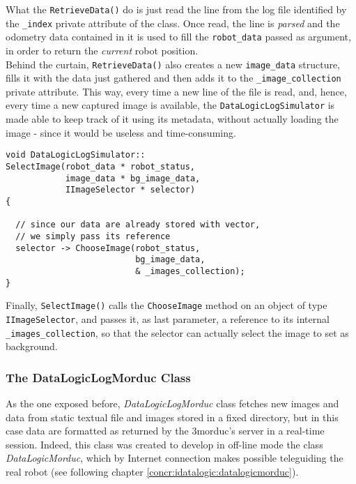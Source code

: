 What the \texttt{RetrieveData()} do is just read the line from the log 
file identified by the \texttt{\_index} private attribute of the class.
Once read, the line is \textit{parsed} and the odometry data contained 
in it is used to fill the \texttt{robot\_data} passed as argument, in 
order to return the \textit{current} robot position.
\\
Behind the curtain, \texttt{RetrieveData()} also creates a new 
\texttt{image\_data} structure, fills it with the data just 
gathered and then adds it to the \texttt{\_image\_collection} 
private attribute.
This way, every time a new line of the file is read, and, hence, 
every time a new captured image is available, the \texttt{DataLogicLogSimulator} 
is made able to keep track of it using its metadata, without actually 
loading the image - since it would be useless and time-consuming.

\begin{lstlisting}[caption={\texttt{DataLogic::SelectImage()} method}, label={code:selectimage_method}, frame=trBL]
void DataLogicLogSimulator::
SelectImage(robot_data * robot_status,
            image_data * bg_image_data,
            IImageSelector * selector)
{

  // since our data are already stored with vector,
  // we simply pass its reference
  selector -> ChooseImage(robot_status, 
                          bg_image_data, 
                          & _images_collection);
}
\end{lstlisting}

Finally, \texttt{SelectImage()} calls the \texttt{ChooseImage} method 
on an object of type \texttt{IImageSelector}, and passes it, as last 
parameter, a reference to its internal \texttt{\_images\_collection}, 
so that the selector can actually select the image to set as 
background.


\subsubsection{The DataLogicLogMorduc Class}
\label{concr:idatalogic:datalogiclogmorduc}

As the one exposed before, \textit{DataLogicLogMorduc} class
fetches new images and data from static textual file and images
stored in a fixed directory, but in this case data are formatted
as returned by the 3morduc's server in a real-time session. Indeed,
this class was created to develop in off-line mode the class
\textit{DataLogicMorduc}, which by Internet connection makes possible
teleguiding the real robot (see following chapter
\ref{concr:idatalogic:datalogicmorduc}).


